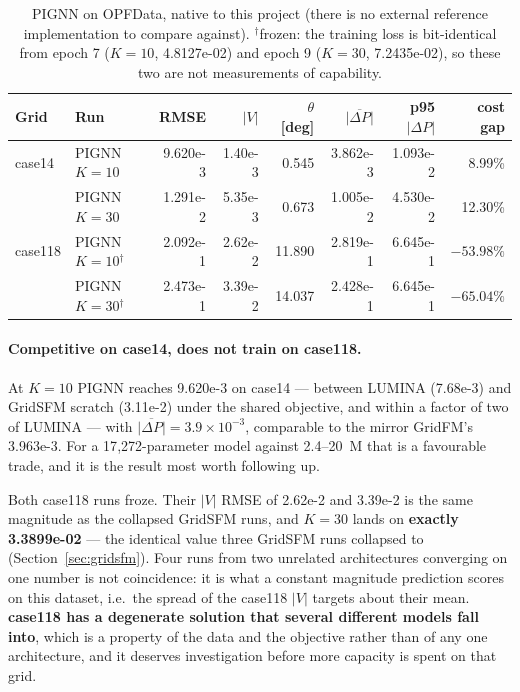 \documentclass[10pt]{article}
\begin{document}
\begin{table}[H]
\centering
\small
\begin{tabular}{llrrrrrr}
\toprule
Grid & Run & RMSE & \(|V|\) & \(\theta\) [deg] & \(\overline{|\Delta P|}\) & p95\(|\Delta P|\) & cost gap \\
\midrule
case14 & PIGNN \(K{=}10\) & 9.620e-3 & 1.40e-3 & 0.545 & 3.862e-3 & 1.093e-2 & 8.99\% \\
       & PIGNN \(K{=}30\) & 1.291e-2 & 5.35e-3 & 0.673 & 1.005e-2 & 4.530e-2 & 12.30\% \\
\midrule
case118 & PIGNN \(K{=}10\)$^{\dagger}$ & 2.092e-1 & 2.62e-2 & 11.890 & 2.819e-1 & 6.645e-1 & \(-53.98\%\) \\
        & PIGNN \(K{=}30\)$^{\dagger}$ & 2.473e-1 & 3.39e-2 & 14.037 & 2.428e-1 & 6.645e-1 & \(-65.04\%\) \\
\bottomrule
\end{tabular}
\caption{PIGNN on OPFData, native to this project (there is no external
reference implementation to compare against). $^{\dagger}$frozen: the training
loss is bit-identical from epoch 7 (\(K{=}10\), 4.8127e-02) and epoch 9
(\(K{=}30\), 7.2435e-02), so these two are not measurements of capability.}
\end{table}

\paragraph{Competitive on case14, does not train on case118.} At \(K{=}10\)
PIGNN reaches 9.620e-3 on case14 --- between LUMINA (7.68e-3) and GridSFM
scratch (3.11e-2) under the shared objective, and within a factor of two of
LUMINA --- with \(\overline{|\Delta P|}=3.9\times10^{-3}\), comparable to the
mirror GridFM's 3.963e-3. For a 17{,}272-parameter model against 2.4--20~M that
is a favourable trade, and it is the result most worth following up.

Both case118 runs froze. Their \(|V|\) RMSE of 2.62e-2 and 3.39e-2 is
the same magnitude as the collapsed GridSFM runs, and \(K{=}30\) lands on
\textbf{exactly 3.3899e-02} --- the identical value three GridSFM runs
collapsed to (Section~\ref{sec:gridsfm}). Four runs from two unrelated
architectures converging on one number is not coincidence: it is what a
constant magnitude prediction scores on this dataset, i.e.\ the spread of the
case118 \(|V|\) targets about their mean. \textbf{case118 has a degenerate
solution that several different models fall into}, which is a property of the
data and the objective rather than of any one architecture, and it deserves
investigation before more capacity is spent on that grid.
\end{document}

